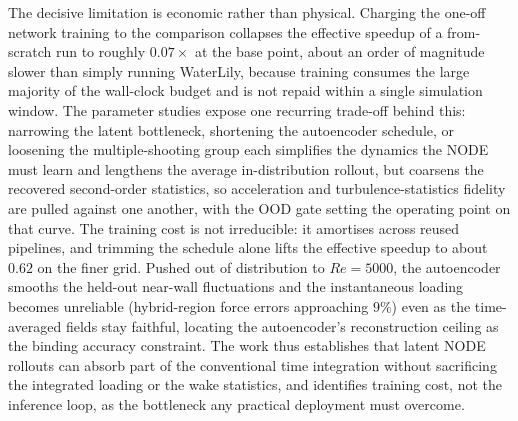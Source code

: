 The decisive limitation is economic rather than physical. Charging the one-off network training to the comparison collapses the effective speedup of a from-scratch run to roughly $0.07\times$ at the base point, about an order of magnitude slower than simply running WaterLily, because training consumes the large majority of the wall-clock budget and is not repaid within a single simulation window. The parameter studies expose one recurring trade-off behind this: narrowing the latent bottleneck, shortening the autoencoder schedule, or loosening the multiple-shooting group each simplifies the dynamics the NODE must learn and lengthens the average in-distribution rollout, but coarsens the recovered second-order statistics, so acceleration and turbulence-statistics fidelity are pulled against one another, with the OOD gate setting the operating point on that curve. The training cost is not irreducible: it amortises across reused pipelines, and trimming the schedule alone lifts the effective speedup to about $0.62$ on the finer grid. Pushed out of distribution to $Re = 5000$, the autoencoder smooths the held-out near-wall fluctuations and the instantaneous loading becomes unreliable (hybrid-region force errors approaching $9\%$) even as the time-averaged fields stay faithful, locating the autoencoder's reconstruction ceiling as the binding accuracy constraint. The work thus establishes that latent NODE rollouts can absorb part of the conventional time integration without sacrificing the integrated loading or the wake statistics, and identifies training cost, not the inference loop, as the bottleneck any practical deployment must overcome.
